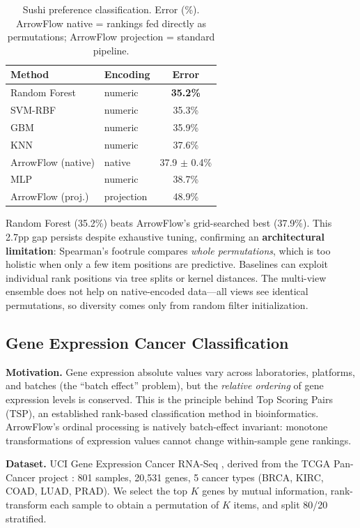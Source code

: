 \documentclass[12pt]{article}
\begin{document}
\begin{table}[ht]
\centering
\caption{Sushi preference classification. Error (\%). ArrowFlow native = rankings fed directly as permutations; ArrowFlow projection = standard pipeline.}
\label{tab:sushi}
\begin{tabular}{llc}
\toprule
Method & Encoding & Error \\
\midrule
Random Forest       & numeric    & \textbf{35.2\%} \\
SVM-RBF             & numeric    & 35.3\% \\
GBM             & numeric    & 35.9\% \\
KNN                 & numeric    & 37.6\% \\
ArrowFlow (native)  & native     & 37.9 $\pm$ 0.4\% \\
MLP                 & numeric    & 38.7\% \\
ArrowFlow (proj.)   & projection & 48.9\% \\
\bottomrule
\end{tabular}
\end{table}

Random Forest (35.2\%) beats ArrowFlow's grid-searched best (37.9\%). This 2.7pp gap persists despite exhaustive tuning, confirming an \textbf{architectural limitation}: Spearman's footrule compares \emph{whole permutations}, which is too holistic when only a few item positions are predictive. Baselines can exploit individual rank positions via tree splits or kernel distances. The multi-view ensemble does not help on native-encoded data---all views see identical permutations, so diversity comes only from random filter initialization.

\subsection{Gene Expression Cancer Classification}
\label{sec:gene}

\textbf{Motivation.} Gene expression absolute values vary across laboratories, platforms, and batches (the ``batch effect'' problem), but the \emph{relative ordering} of gene expression levels is conserved. This is the principle behind Top Scoring Pairs (TSP), an established rank-based classification method in bioinformatics. ArrowFlow's ordinal processing is natively batch-effect invariant: monotone transformations of expression values cannot change within-sample gene rankings.

\textbf{Dataset.} UCI Gene Expression Cancer RNA-Seq \citep{dua2019uci}, derived from the TCGA Pan-Cancer project \citep{weinstein2013cancer}: 801 samples, 20{,}531 genes, 5 cancer types (BRCA, KIRC, COAD, LUAD, PRAD). We select the top $K$ genes by mutual information, rank-transform each sample to obtain a permutation of $K$ items, and split 80/20 stratified.
\end{document}
